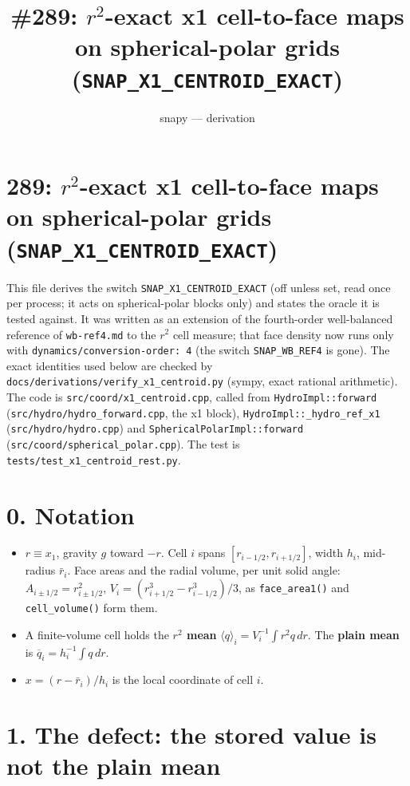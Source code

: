 \documentclass[11pt,a4paper]{article}
\title{\#289: $r^2$-exact x1 cell-to-face maps on spherical-polar grids (\texttt{SNAP\_X1\_CENTROID\_EXACT})}
\author{snapy --- derivation}\date{}
\begin{document}
\maketitle
\section*{289: $r^2$-exact x1 cell-to-face maps on spherical-polar grids (\texttt{SNAP\_X1\_CENTROID\_EXACT})}

This file derives the switch \texttt{SNAP\_X1\_CENTROID\_EXACT} (off unless set, read once per process; it acts on
spherical-polar blocks only) and states the oracle it is tested against. It was written as an extension of
the fourth-order well-balanced reference of \texttt{wb-ref4.md} to the $r^2$ cell measure; that face density now runs
only with \texttt{dynamics/conversion-order: 4} (the switch \texttt{SNAP\_WB\_REF4} is gone). The exact identities used
below are checked by \texttt{docs/derivations/verify\_x1\_centroid.py} (sympy, exact rational arithmetic). The code is
\texttt{src/coord/x1\_centroid.cpp}, called from \texttt{HydroImpl::forward} (\texttt{src/hydro/hydro\_forward.cpp}, the x1 block),
\texttt{HydroImpl::\_hydro\_ref\_x1} (\texttt{src/hydro/hydro.cpp}) and \texttt{SphericalPolarImpl::forward}
(\texttt{src/coord/spherical\_polar.cpp}). The test is \texttt{tests/test\_x1\_centroid\_rest.py}.

\section*{0. Notation}

\begin{itemize}
\item $r \equiv x_1$, gravity $g$ toward $-r$. Cell $i$ spans $[r_{i-1/2}, r_{i+1/2}]$, width $h_i$, mid-radius
  $\bar r_i$. Face areas and the radial volume, per unit solid angle: $A_{i\pm1/2} = r_{i\pm1/2}^2$,
  $V_i = (r_{i+1/2}^3 - r_{i-1/2}^3)/3$, as \texttt{face\_area1()} and \texttt{cell\_volume()} form them.
\item A finite-volume cell holds the \textbf{$r^2$ mean} $\langle q\rangle_i = V_i^{-1}\int r^2 q\,dr$. The \textbf{plain mean}
  is $\overline{q}_i = h_i^{-1}\int q\,dr$.
\item $x = (r - \bar r_i)/h_i$ is the local coordinate of cell $i$.
\end{itemize}

\section*{1. The defect: the stored value is not the plain mean}
\end{document}
